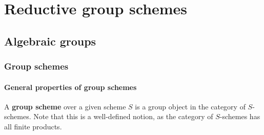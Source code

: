\chapter{Reductive group schemes}
    \section{Algebraic groups}
        \subsection{Group schemes}
            \subsubsection{General properties of group schemes}
                \begin{definition} \label{def: group_schemes}
                    A \textbf{group scheme} over a given scheme $S$ is a group object in the category of $S$-schemes. Note that this is a well-defined notion, as the category of $S$-schemes has all finite products.
                    

\end{definition}
